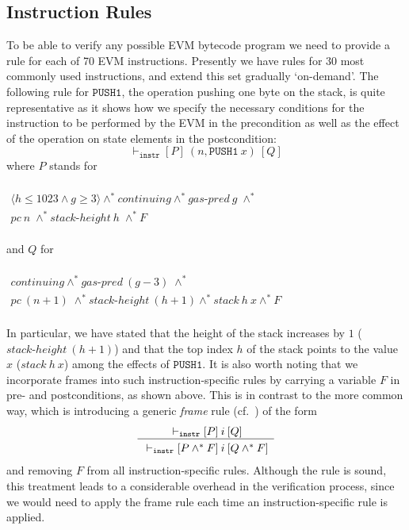 \documentclass[sigplan,10pt,review]{acmart}\settopmatter{printfolios=true,printccs=false,printacmref=false}
\newcommand{\sconj}{\wedge^*}
\newcommand{\ttrip}[5]{\mathit{#1} \vdash_{\mathrm{#2}}[#3]\:#4\:[#5]}
\newcommand{\cont}{\mathit{continuing}}
\newcommand{\pc}{\mathit{pc}}
\newcommand{\gaspred}{\mathit{gas\mbox{-}pred}}
\newcommand{\stackh}{\mathit{stack\mbox{-}height}}
\newcommand{\stack}{\mathit{stack}}
\newcommand{\instr}[1]{\mathtt{#1}}
\newcommand{\pure}[1]{\langle#1\rangle}
\newcommand{\RuleC}[2]{\begin{array}{c}#1\\\hline\noalign{\smallskip}#2\end{array}}
\begin{document}
\subsection{Instruction Rules}
\label{sec:instr-rules}
To be able to verify any possible EVM bytecode program we need to provide a rule for 
each of 70 EVM instructions. Presently we have rules for 30 most commonly used instructions,
and extend this set gradually `on-demand'.  
The following rule for $\instr{PUSH1}$, the operation pushing one byte on the stack, is quite representative
as it shows how we specify the necessary conditions for 
the instruction to be performed by the EVM in the precondition as well as 
the effect of the operation on state elements in the postcondition:
\[
\ttrip{}{\mathtt{instr}}{P}{(n, \instr{PUSH1}\:x)}{Q}
\]
where $P$ stands for 
\\
\\$
\begin{array}{l}
\pure{h \le 1023 \wedge g \geq 3} \sconj \cont \sconj \gaspred\:g \; \sconj \\
\pc\:n \; \sconj \stackh\:h \; \sconj F 
\end{array}
$\\ 
\\
and $Q$ for\\
\\$
\begin{array}{l}
\cont \sconj \gaspred\:(g - 3) \; \sconj \\
\pc\:(n+1) \; \sconj \stackh\:(h + 1) \sconj \stack\:h\:x \sconj F
\end{array}
$\\
\\
In particular, we have stated that the height of the stack increases by $1$ 
($\stackh\:(h + 1)$)
and that the top index $h$ of the stack points to the value $x$ ($\stack\:h\:x$)
among the effects of $\instr{PUSH1}$. It is also worth noting that we incorporate frames
into such instruction-specific rules by carrying a variable $F$ in pre- and
postconditions, as shown above. This is in contrast to the more common way, which is
introducing a generic \emph{frame} rule (cf.~\cite{Reynolds_02}) of the form
\[
\RuleC{\ttrip{}{\mathtt{instr}}{P}{i}{Q}}{\ttrip{}{\mathtt{instr}}{P \sconj F}{i}{Q \sconj F}}
\] 
and removing $F$ from all instruction-specific rules. Although the rule is sound, this treatment leads to 
a considerable overhead in the verification process, since we would need to apply
the frame rule each time an instruction-specific rule is applied. 
\end{document}
